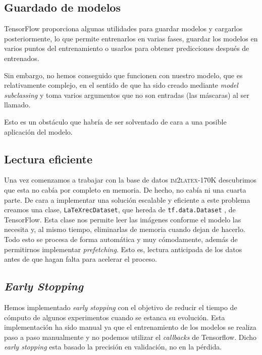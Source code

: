 \documentclass[a4paper, 20pt, dvipsnames]{article}
\begin{document}
\subsection{Guardado de modelos}

TensorFlow proporciona algunas utilidades para guardar modelos y cargarlos
posteriormente, lo que permite entrenarlos en varias fases, guardar los modelos
en varios puntos del entrenamiento o usarlos para obtener predicciones después
de entrenados.

Sin embargo, no hemos conseguido que funcionen con nuestro modelo, que es
relativamente complejo, en el sentido de que ha sido creado mediante \emph{model
  subclassing} y toma varios argumentos que no son entradas (las máscaras) al
ser llamado.

Esto es un obstáculo que habría de ser solventado de cara a una posible
aplicación del modelo.

\subsection{Lectura eficiente}

Una vez comenzamos a trabajar con la base de datos \textsc{im2latex-170K}
descubrimos que esta no cabía por completo en memoria. De hecho, no cabía ni una
cuarta parte. De cara a implementar una solución escalable y eficiente a este
problema creamos una clase, \texttt{LaTeXrecDataset}, que hereda de
\texttt{tf.data.Dataset} \cite{tf_dataset}, de TensorFlow. Esta clase nos
permite leer las imágenes conforme el modelo las necesita y, al mismo tiempo,
eliminarlas de memoria cuando dejan de hacerlo. Todo esto se procesa de forma
automática y muy cómodamente, además de permitirnos implementar
\emph{prefetching}. Esto es, lectura anticipada de los datos antes de que hagan
falta para acelerar el proceso.

\subsection{\emph{Early Stopping}}
\label{early-stopping}

Hemos implementado \emph{early stopping} con el objetivo de reducir el tiempo
de cómputo de algunos experimentos cuando se estanca su evolución. Esta
implementación ha sido manual ya que el entrenamiento de los modelos se
realiza paso a paso manualmente y no podemos utilizar el \emph{callbacks}
de Tensorflow. Dicho \emph{early stopping} esta basado la precisión en
validación, no en la pérdida.
\end{document}
